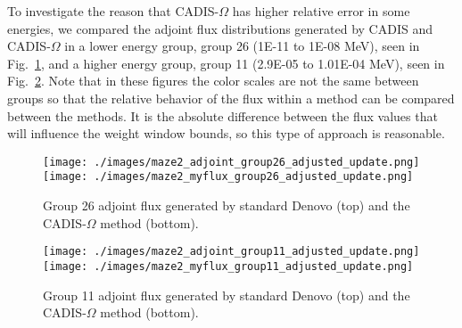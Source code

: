 \documentclass[12pt]{article}
\begin{document}
To investigate the reason that CADIS-$\Omega$ has higher relative error in some energies, we compared the adjoint flux distributions generated by CADIS and CADIS-$\Omega$ in a lower energy group, group 26 (1E-11 to 1E-08 MeV), seen in Fig.~\ref{fig::adjoint_fluxes_group26}, and a higher energy group, group 11 (2.9E-05 to 1.01E-04 MeV), seen in Fig.~\ref{fig::adjoint_fluxes_group11}.
Note that in these figures the color scales are not the same between groups so that the relative behavior of the flux within a method can be compared between the methods. It is the absolute difference between the flux values that will influence the weight window bounds, so this type of approach is reasonable. 

\begin{figure}
  \begin{center}
    \texttt{[image: ./images/maze2\_adjoint\_group26\_adjusted\_update.png]}
    \texttt{[image: ./images/maze2\_myflux\_group26\_adjusted\_update.png]}
    \caption[]{\label{fig::adjoint_fluxes_group26} Group 26 adjoint flux generated by standard Denovo (top) and the CADIS-$\Omega$ method (bottom).}
  \end{center}
\end{figure}

\begin{figure}
  \begin{center}
    \texttt{[image: ./images/maze2\_adjoint\_group11\_adjusted\_update.png]}
    \texttt{[image: ./images/maze2\_myflux\_group11\_adjusted\_update.png]}
    \caption[]{\label{fig::adjoint_fluxes_group11} Group 11 adjoint flux generated by standard Denovo (top) and the CADIS-$\Omega$ method (bottom).}
  \end{center}
\end{figure}
\end{document}
